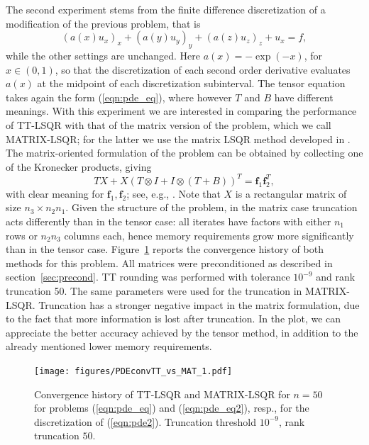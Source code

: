 \documentclass{siamart190516}
\begin{document}
The second experiment stems from the finite difference
discretization of a modification of the previous problem,
that is
\begin{equation}\label{eqn:pde2}
(a(x) u_x)_x + (a(y) u_y)_y +(a(z) u_z)_z + u_x = f,
\end{equation}
while the other settings are unchanged. Here
$a(x)=-\exp(-x)$, for $x\in (0,1)$, so that the
discretization of each second order derivative
evaluates $a(x)$ at the midpoint of each discretization
subinterval. The tensor equation takes again the form
(\ref{eqn:pde_eq}), where however $T$ and $B$ have
different meanings.
With this experiment we are interested in comparing the
performance of TT-LSQR with that of the matrix
version of the problem, which we call MATRIX-LSQR; for
the latter we use the matrix LSQR method 
developed in \cite{simoncini:hal-04437719}. 
The matrix-oriented formulation of the
problem can be obtained by collecting
one of the Kronecker products, giving
\begin{equation}\label{eqn:pde_eq2}
 TX  +  X\left ( T \otimes I +  I \otimes (T +
 B) \right )^T= \bm f_1 \bm f_2^T,
\end{equation}
with clear meaning for $\bm f_1, \bm f_2$; see, e.g., \cite{palitta2016matrix}.
Note that $X$ is a rectangular matrix of size
$n_3\times n_2n_1$. Given the structure of the
problem, in the matrix case truncation acts differently
than in the tensor case: all iterates have factors with either
$n_1$ rows or $n_2n_3$ columns each, hence memory requirements grow more significantly than in the tensor
case.
Figure~\ref{fig:pde_conv} reports the convergence history of
both methods for this problem. All matrices were
preconditioned as described in section~\ref{sec:precond}.
 TT rounding was performed
with tolerance $10^{-9}$ and rank truncation 50. The same
parameters were used for the truncation in MATRIX-LSQR. Truncation has a stronger negative
impact in the matrix formulation, due to the fact that more
information is lost after truncation.
In the plot, we can appreciate the better accuracy achieved
by the tensor method, in addition to the already mentioned
lower memory requirements.

\begin{figure}[htb]
\centering
\texttt{[image: figures/PDEconvTT\_vs\_MAT\_1.pdf]}\,
\caption{Convergence history of TT-LSQR and MATRIX-LSQR
for $n=50$ for problems (\ref{eqn:pde_eq}) and (\ref{eqn:pde_eq2}), resp., for the discretization of (\ref{eqn:pde2}). Truncation threshold $10^{-9}$, rank truncation $50$.\label{fig:pde_conv}}
\end{figure}
\end{document}
